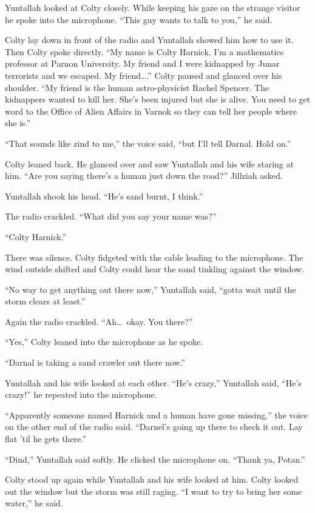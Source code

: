 Yuntallah looked at Colty closely. While keeping his gaze on the strange visitor he spoke into
the microphone. ``This guy wants to talk to you,'' he said.

Colty lay down in front of the radio and Yuntallah showed him how to use it. Then Colty spoke
directly. ``My name is Colty Harnick. I'm a mathematics professor at Parnon University. My
friend and I were kidnapped by Junar terrorists and we escaped. My friend\ldots.'' Colty paused
and glanced over his shoulder. ``My friend is the human astro-physicist Rachel Spencer. The
kidnappers wanted to kill her. She's been injured but she is alive. You need to get word to the
Office of Alien Affairs in Varnok so they can tell her people where she is.''

``That sounds like zind to me,'' the voice said, ``but I'll tell Darnal. Hold on.''

Colty leaned back. He glanced over and saw Yuntallah and his wife staring at him. ``Are you
saying there's a human just down the road?'' Jillziah asked.

Yuntallah shook his head. ``He's sand burnt, I think.''

The radio crackled. ``What did you say your name was?''

``Colty Harnick.''

There was silence. Colty fidgeted with the cable leading to the microphone. The wind outside
shifted and Colty could hear the sand tinkling against the window.

``No way to get anything out there now,'' Yuntallah said, ``gotta wait until the storm clears at
least.''

Again the radio crackled. ``Ah\ldots\ okay. You there?''

``Yes,'' Colty leaned into the microphone as he spoke.

``Darnal is taking a sand crawler out there now.''

Yuntallah and his wife looked at each other. ``He's crazy,'' Yuntallah said, ``He's crazy!'' he
repeated into the microphone.

``Apparently someone named Harnick and a human have gone missing,'' the voice on the other end
of the radio said. ``Darnel's going up there to check it out. Lay flat 'til he gets there.''

``Dind,'' Yuntallah said softly. He clicked the microphone on. ``Thank ya, Potan.''

Colty stood up again while Yuntallah and his wife looked at him. Colty looked out the window but
the storm was still raging. ``I want to try to bring her some water,'' he said.


